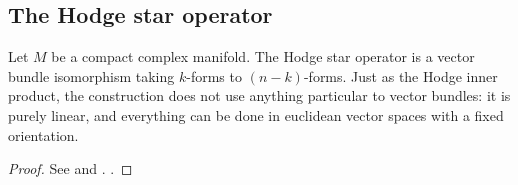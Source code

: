 \subsection{The Hodge star operator}
Let \(M\) be a compact complex manifold. The Hodge star operator is a vector bundle isomorphism taking \(k\)-forms to \((n-k)\)-forms. Just as the Hodge inner product, the construction does not use anything particular to vector bundles: it is purely linear, and everything can be done in euclidean vector spaces with a fixed orientation. 

\begin{proof}
    See \parencite[Prop. 9.8]{lee_introCM} and \parencite[Lemma 9.23-(b)]{lee_introCM}.  .
\end{proof}

